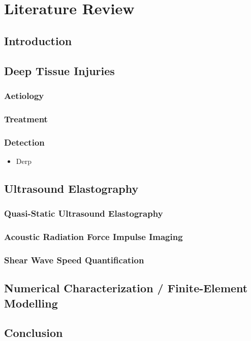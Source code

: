 \chapter{Literature Review}
	\section{Introduction}
		\lipsum[1]
	\section{Deep Tissue Injuries}
		\lipsum[1]
		\subsection{Aetiology}
			\lipsum[1]
		\subsection{Treatment}
			\lipsum[1]
		\subsection{Detection}
			\begin{itemize}
				\item Derp
			\end{itemize}
	\section{Ultrasound Elastography}
		\lipsum[1]
		\subsection{Quasi-Static Ultrasound Elastography}
			\lipsum[1]
		\subsection{Acoustic Radiation Force Impulse Imaging}
			\lipsum[1]
		\subsection{Shear Wave Speed Quantification}
			\lipsum[1]
	\section{Numerical Characterization / Finite-Element Modelling}
		\lipsum[1]
	\section{Conclusion}
		\lipsum[1]
